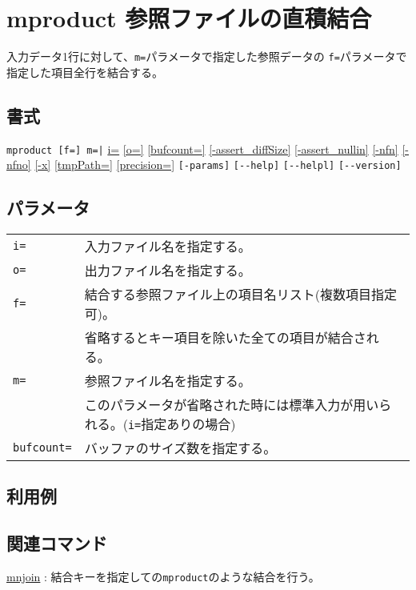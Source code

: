 
%

\section{mproduct 参照ファイルの直積結合\label{sect:mproduct}}
入力データ1行に対して、\verb|m=|パラメータで指定した参照データの
\verb|f=|パラメータで指定した項目全行を結合する。

\subsection*{書式}
\verb/mproduct [f=] m=|/
\hyperref[sect:option_i]{i=}
\hyperref[sect:option_o]{[o=]}
\hyperref[sect:option_bufcount]{[bufcount=]} 
\hyperref[sect:option_assert_diffSize]{[-assert\_diffSize]}
\hyperref[sect:option_assert_nullin]{[-assert\_nullin]}
\hyperref[sect:option_nfn]{[-nfn]} 
\hyperref[sect:option_nfno]{[-nfno]}  
\hyperref[sect:option_x]{[-x]}
\hyperref[sect:option_option_tmppath]{[tmpPath=]}
\hyperref[sect:option_precision]{[precision=]}
\verb|[-params]|
\verb|[--help]|
\verb|[--helpl]|
\verb|[--version]|\\

\subsection*{パラメータ}
\begin{table}[htbp]
{\small
\begin{tabular}{ll}
\verb|i=|    & 入力ファイル名を指定する。\\
\verb|o=|    & 出力ファイル名を指定する。\\
\verb|f=|    & 結合する参照ファイル上の項目名リスト(複数項目指定可)。\\
             & 省略するとキー項目を除いた全ての項目が結合される。\\
\verb|m=|    & 参照ファイル名を指定する。\\
             & このパラメータが省略された時には標準入力が用いられる。(\verb|i=|指定ありの場合)\\
\verb|bufcount=| & バッファのサイズ数を指定する。 \\
\end{tabular} 
}
\end{table} 

\subsection*{利用例}

\subsection*{関連コマンド}

\hyperref[sect:mnjoin]{mnjoin} : 結合キーを指定しての\verb|mproduct|のような結合を行う。

%

